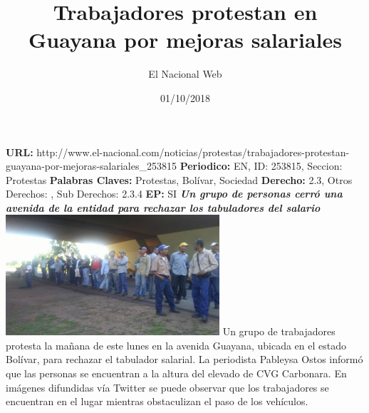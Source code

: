 \documentclass{article}%
\title{\textbf{Trabajadores protestan en Guayana por mejoras salariales}}%
\author{El Nacional Web}%
\date{01/10/2018}%
\begin{document}
%
\normalsize%
\maketitle%
\textbf{URL: }%
http://www.el{-}nacional.com/noticias/protestas/trabajadores{-}protestan{-}guayana{-}por{-}mejoras{-}salariales\_253815\newline%
%
\textbf{Periodico: }%
EN, %
ID: %
253815, %
Seccion: %
Protestas\newline%
%
\textbf{Palabras Claves: }%
Protestas, Bolívar, Sociedad\newline%
%
\textbf{Derecho: }%
2.3, %
Otros Derechos: %
, %
Sub Derechos: %
2.3.4\newline%
%
\textbf{EP: }%
SI\newline%
\newline%
%
\textbf{\textit{Un grupo de personas cerró una avenida de la entidad para rechazar los tabuladores del salario}}%
\newline%
\newline%
%
\includegraphics[width=300px]{181.jpg}%
\newline%
%
Un grupo de trabajadores protesta la mañana de este lunes en la avenida Guayana, ubicada en el estado Bolívar, para rechazar el tabulador salarial.%
\newline%
%
La periodista Pableysa Ostos informó que las personas se encuentran a la altura del elevado de CVG Carbonara.%
\newline%
%
En imágenes difundidas vía Twitter se puede observar que los trabajadores se encuentran en el lugar mientras obstaculizan el paso de los vehículos.%
\newline%
%
\end{document}
